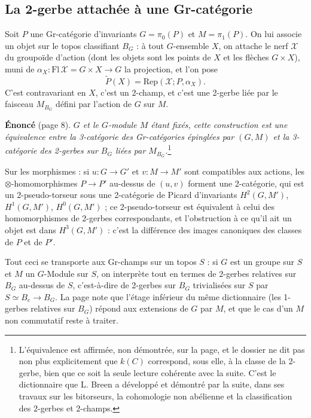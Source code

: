 \documentclass[11pt,a4paper]{article}
\begin{document}
\subsection*{La 2-gerbe attachée à une Gr-catégorie}

Soit $P$ une Gr-catégorie d'invariants $G = \pi_{0}(P)$ et $M = \pi_{1}(P)$.
On lui associe un objet sur le topos classifiant $B_{G}$ : à tout $G$-ensemble
$X$, on attache le nerf $\mathcal{X}$ du groupoïde d'action (dont les objets
sont les points de $X$ et les flèches $G \times X$), muni de
$\alpha_{X} : \mathrm{Fl}\,\mathcal{X} = G \times X \to G$ la projection, et
l'on pose
\[
\widetilde{P}(X) = \mathrm{Rep}(\mathcal{X}; P, \alpha_{X}).
\]
C'est contravariant en $X$, c'est un 2-champ, et c'est une 2-gerbe liée par le
faisceau $M_{B_{G}}$ défini par l'action de $G$ sur $M$.

\textbf{Énoncé} (page 8). \emph{$G$ et le $G$-module $M$ étant fixés, cette
construction est une équivalence entre la 3-catégorie des Gr-catégories
épinglées par $(G,M)$ et la 3-catégorie des 2-gerbes sur $B_{G}$ liées par
$M_{B_{G}}$.}\footnote{L'équivalence est affirmée, non démontrée, sur la page,
et le dossier ne dit pas non plus explicitement que $k(C)$ correspond, sous
elle, à la classe de la 2-gerbe, bien que ce soit la seule lecture cohérente
avec la suite. C'est le dictionnaire que L. Breen a développé et démontré par
la suite, dans ses travaux sur les bitorseurs, la cohomologie non abélienne et
la classification des 2-gerbes et 2-champs.}

Sur les morphismes : si $u : G \to G'$ et $v : M \to M'$ sont compatibles aux
actions, les $\otimes$-homomorphismes $P \to P'$ au-dessus de $(u,v)$ forment
une 2-catégorie, qui est un 2-pseudo-torseur sous une 2-catégorie de Picard
d'invariants $H^{2}(G,M')$, $H^{1}(G,M')$, $H^{0}(G,M')$ ; ce
2-pseudo-torseur est équivalent à celui des homomorphismes de 2-gerbes
correspondants, et l'obstruction à ce qu'il ait un objet est dans
$H^{3}(G,M')$ : c'est la différence des images canoniques des classes de $P$
et de $P'$.

Tout ceci se transporte aux Gr-champs sur un topos $S$ : si $G$ est un groupe
sur $S$ et $M$ un $G$-Module sur $S$, on interprète tout en termes de 2-gerbes
relatives sur $B_{G}$ au-dessus de $S$, c'est-à-dire de 2-gerbes sur $B_{G}$
trivialisées sur $S$ par $S \simeq B_{e} \to B_{G}$. La page note que l'étage
inférieur du même dictionnaire (les 1-gerbes relatives sur $B_{G}$) répond
aux extensions de $G$ par $M$, et que le cas d'un $M$ non commutatif reste à
traiter.
\end{document}
